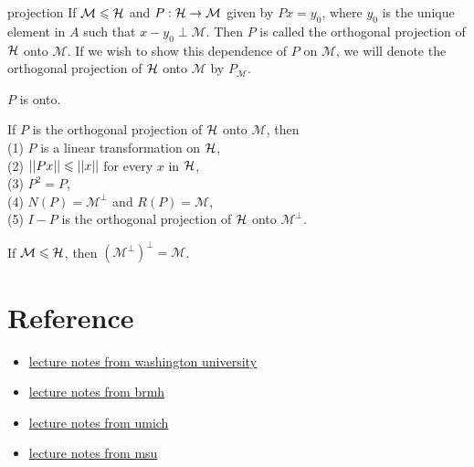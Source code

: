 \begin{definition}{}{projection}
    If $\mathcal{M}\leqslant \mathcal{H}$ and $P: \mathcal{H}\rightarrow \mathcal{M}$ given by $Px = y_0$, 
    where $y_0$ is the unique element in $A$ such that $x -y_0\perp \mathcal{M}$.
    Then $P$ is called the orthogonal projection of $\mathcal{H}$ onto $\mathcal{M}$. If we wish to show this dependence of $P$ on $\mathcal{M}$, 
we will denote the orthogonal projection of $\mathcal{H}$ onto $\mathcal{M}$ by $P_{\mathcal{M}}$.
\end{definition}
\begin{remark}
    $P$ is onto.
\end{remark}


\begin{theorem}{}{}
    If $P$ is the orthogonal projection of $\mathcal{H}$ onto $\mathcal{M}$, then\\
    (1) $P$ is a linear transformation on $\mathcal{H}$,\\
    (2) $||Px||\leqslant ||x||$ for every $x$ in $\mathcal{H}$,\\
    (3) $P^2=P$,\\
    (4) $N(P) = \mathcal{M}^{\perp}$ and $R(P)=\mathcal{M}$, \\
    (5) $I-P$ is the orthogonal projection of $\mathcal{H}$ onto $\mathcal{M}^{\perp}$.
\end{theorem}

\begin{corollary}{}{}
    If $\mathcal{M}\leqslant \mathcal{H}$, then $(\mathcal{M}^{\perp})^{\perp}=\mathcal{M}$. 
\end{corollary}

\section{Reference}
\begin{itemize}
    \item \href{https://sites.math.washington.edu/~burke/crs/555/555_notes/hilbert.pdf}{lecture notes from washington university}
    \item \href{https://web.mat.bham.ac.uk/~malevao/MSM3P21/l12.pdf}{lecture notes from brmh}
    \item \href{https://web.eecs.umich.edu/~fessler/course/600/l/l03.pdf}{lecture notes from umich}
    \item \href{https://users.math.msu.edu/users/banelson/teaching/920/chI_notes.pdf}{lecture notes from msu}
\end{itemize}


